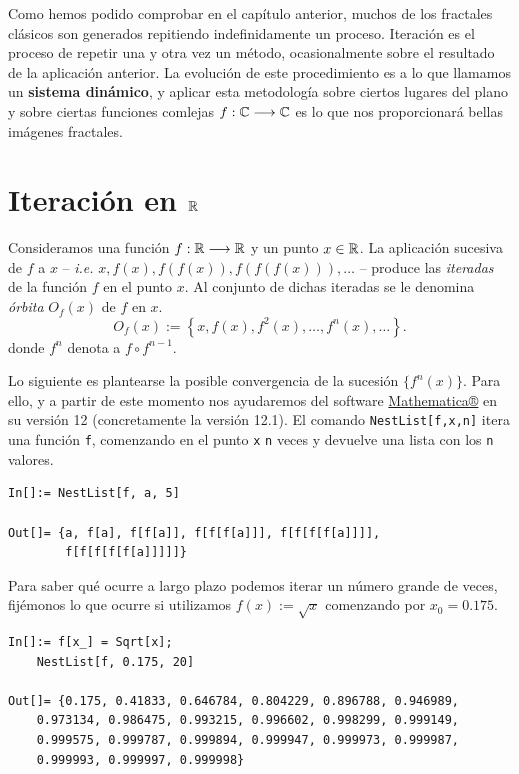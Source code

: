 
Como hemos podido comprobar en el capítulo anterior, muchos de los fractales clásicos son generados repitiendo indefinidamente un proceso. Iteración es el proceso de repetir una y otra vez un método, ocasionalmente sobre el resultado de la aplicación anterior. La evolución de este procedimiento es a lo que llamamos un \textbf{sistema dinámico}, y aplicar esta metodología sobre ciertos lugares del plano y sobre ciertas funciones comlejas $f:\mathbb{C}\longrightarrow\mathbb{C}$ es lo que nos proporcionará bellas imágenes fractales.

\section{Iteración en $\mathbb{R}$}
\begin{definicion}
    Consideramos una función $f:\mathbb{R}\longrightarrow\mathbb{R}$ y un punto $x\in\mathbb{R}$. La aplicación sucesiva de $f$ a $x$ -- \textit{i.e.} $x,f(x),f(f(x)), f(f(f(x))),\dots$ -- produce las \textit{iteradas} de la función $f$ en el punto $x$. Al conjunto de dichas iteradas se le denomina \textit{órbita} $O_f(x)$ de $f$ en $x$.
    $$
    O_f(x):=\left\lbrace x, f(x), f^2(x), \dots, f^n(x), \dots\right\rbrace.
    $$
    donde $f^n$ denota a $f\circ f^{n-1}$.
\end{definicion}

Lo siguiente es plantearse la posible convergencia de la sucesión $\{f^n(x)\}$. Para ello, y a partir de este momento nos ayudaremos del software \textcolor{blue}{\href{https://www.wolfram.com/mathematica/}{Mathematica®}} en su versión 12 (concretamente la versión 12.1). El comando \verb|NestList[f,x,n]| itera una función \verb|f|, comenzando en el punto \verb|x| \verb|n| veces y devuelve una lista con los \verb|n| valores. 

\begin{verbatim}
In[]:= NestList[f, a, 5]

Out[]= {a, f[a], f[f[a]], f[f[f[a]]], f[f[f[f[a]]]], 
        f[f[f[f[f[a]]]]]}
\end{verbatim}

Para saber qué ocurre a largo plazo podemos iterar un número grande de veces, fijémonos lo que ocurre si utilizamos $f(x):=\sqrt{x}$ comenzando por $x_0=0.175$.

\begin{verbatim}
In[]:= f[x_] = Sqrt[x];
    NestList[f, 0.175, 20]
    
Out[]= {0.175, 0.41833, 0.646784, 0.804229, 0.896788, 0.946989, 
    0.973134, 0.986475, 0.993215, 0.996602, 0.998299, 0.999149, 
    0.999575, 0.999787, 0.999894, 0.999947, 0.999973, 0.999987, 
    0.999993, 0.999997, 0.999998}
\end{verbatim}

